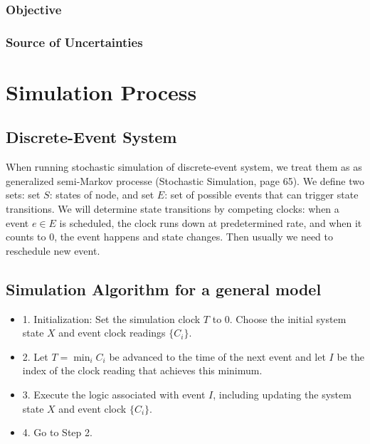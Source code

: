 \documentclass[letterpaper]{article}
\begin{document}
\subsubsection{Objective}
\subsubsection{Source of Uncertainties}

\section{Simulation Process}
\subsection{Discrete-Event System}
When running stochastic simulation of discrete-event system, we treat them as as generalized semi-Markov processe (Stochastic Simulation, page 65). We define two sets: set $S$: states of node,
and set $E$: set of possible events that can trigger state transitions. We will determine state transitions by competing clocks: when a event $e\in E$ is scheduled, the clock runs down at predetermined rate, and when it counts to $0$, the event happens and state changes. Then usually we need to reschedule new event.
\subsection{Simulation Algorithm for a general model}
\begin{itemize}
\item{1. Initialization:} Set the simulation clock $T$ to 0. Choose the initial system state $X$ and event clock readings $\{C_i\}$.
\item{2.} Let $T=\min_iC_i$ be advanced to the time of the next event and let $I$ be the index of the clock reading that achieves this minimum.
\item{3.} Execute the logic associated with event $I$, including updating the system state $X$ and event clock $\{C_i\}$.
\item{4.} Go to Step 2.
\end{itemize}
\end{document}
